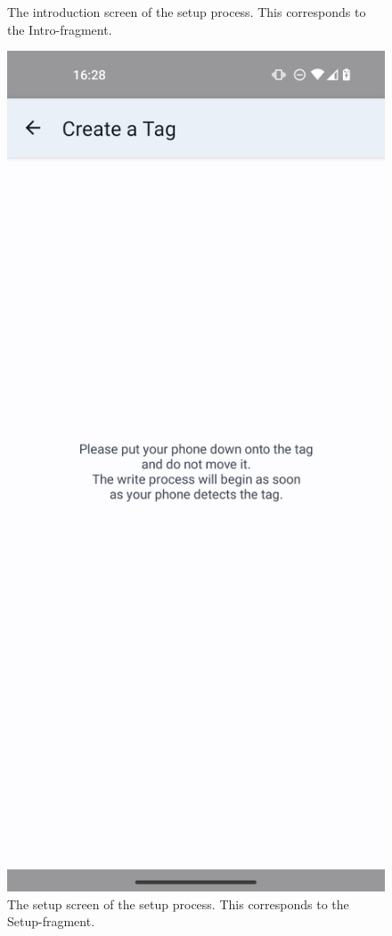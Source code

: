 \documentclass[conference]{IEEEtran}
\newcommand{\phonescreenwidth}{2.69in}
\begin{document}
\begin{figure}
\begin{minipage}{\phonescreenwidth}
		\caption{The introduction screen of the setup process. This corresponds to the Intro-fragment.}
		\label{fig:setup-intro}
	\end{minipage}
	\begin{minipage}{\phonescreenwidth}
		\includegraphics[width=\textwidth]{screenshots/s-setup.png}
		\caption{The setup screen of the setup process. This corresponds to the Setup-fragment.}
		\label{fig:setup-setup}
	\end{minipage}
\end{figure}
\end{document}
